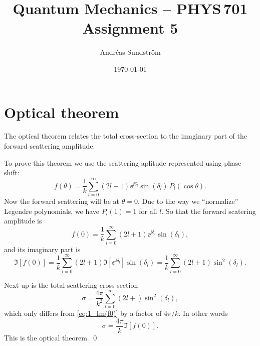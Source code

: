 \documentclass[11pt,letter, swedish, english
]{article}
\begin{document}
\title{Quantum Mechanics -- PHYS\,701 \\
Assignment 5}
\author{Andréas Sundström}
\date{\today}

\maketitle



\section{Optical theorem}
The optical theorem relates the total cross-section to the imaginary
part of the forward scattering amplitude. 

To prove this theorem we use the scattering aplitude represented using
phase shift:
\begin{equation}
f(\theta)=\frac{1}{k}\sum_{l=0}^\infty
(2l+1)\ee^{\ii\delta_l}\sin(\delta_l)\,P_l(\cos\theta).
\end{equation}
Now the forward scattering will be at $\theta=0$. Due to the way
we ``normalize'' Legendre polynomials\footnotemark{}, we have $P_l(1)=1$
for all $l$. So that the forward scatering amplitude is
\begin{equation}
f(0)=\frac{1}{k}\sum_{l=0}^\infty
(2l+1)\ee^{\ii\delta_l}\sin(\delta_l),
\end{equation}
and its imaginary part is
\begin{equation}\label{eq:1_Im(f0)}
\Im[f(0)]=\frac{1}{k}\sum_{l=0}^\infty
(2l+1)\Im[\ee^{\ii\delta_l}]\sin(\delta_l)
=\frac{1}{k}\sum_{l=0}^\infty (2l+1)\sin^2(\delta_l).
\end{equation}


Next up is the total scattering cross-section
\begin{equation}\label{eq:1_sigma}
\sigma=\frac{4\pi}{k^2}\sum_{l=0}^\infty
(2l+)\sin^2(\delta_l),
\end{equation}
which only differs from \eqref{eq:1_Im(f0)} by a factor of
$4\pi/k$. In other words
\begin{equation}
\sigma=\frac{4\pi}{k}\Im[f(0)].
\end{equation}
This is the optical theorem.
\qed
\end{document}
